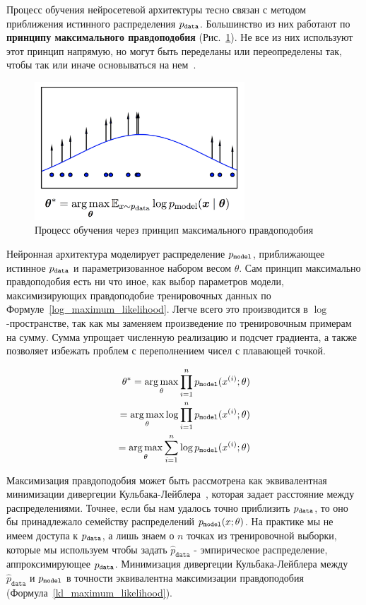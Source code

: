 \documentclass{spbau-diploma}
\begin{document}
Процесс обучения нейросетевой архитектуры тесно связан с методом приближения 
истинного распределения $p_{\texttt{data}}$. Большинство из них работают по 
\textbf{принципу максимального правдоподобия} (Рис.~\ref{mll_density}). Не 
все из них используют этот принцип напрямую, но могут быть переделаны или
переопределены так, чтобы так или иначе основываться на нем~\cite{1701.00160}.

\begin{figure}[H]
\centering
\includegraphics[width=0.7\textwidth]{images/mll_density.png}
\caption{Процесс обучения через принцип максимального правдоподобия~\cite{1701.00160}}
\label{mll_density}
\end{figure}

Нейронная архитектура моделирует распределение $p_{\texttt{model}}$, приближающее истинное
$p_{\texttt{data}}$ и параметризованное набором весом $\theta$. Сам принцип максимально 
правдоподобия есть ни что иное, как выбор параметров модели, максимизирующих
правдоподобие тренировочных данных по Формуле~\ref{log_maximum_likelihood}. 
Легче всего это производится в $\log$-пространстве, так как мы заменяем 
произведение по тренировочным примерам на сумму. Сумма
упрощает численную реализацию и подсчет градиента, а также 
позволяет избежать проблем с переполнением чисел с плавающей точкой. 

\begin{equation}
\label{log_maximum_likelihood}
\begin{split}
\theta^* = \operatorname*{arg\,max}_{\theta} \prod^{n}_{i=1}{p_{\texttt{model}}(x^{(i)}; \theta)} \\
= \operatorname*{arg\,max}_{\theta} \log \prod^{n}_{i=1}{p_{\texttt{model}}(x^{(i)}; \theta)} \\
= \operatorname*{arg\,max}_{\theta} \sum\limits^{n}_{i=1}{\log p_{\texttt{model}}(x^{(i)}; \theta)}
\end{split}
\end{equation}

Максимизация правдоподобия может быть рассмотрена как эквивалентная минимизации
дивергеции Кульбака-Лейблера~\cite{wiki:kldiv}, которая задает
расстояние между распределениями. Точнее, если бы нам удалось точно приблизить 
$p_{\texttt{data}}$, то оно бы принадлежало семейству распределений $p_{\texttt{model}}(x; \theta)$. 
На практике мы не имеем доступа к $p_{\texttt{data}}$, а лишь знаем о $n$ точках из 
тренировочной выборки, которые мы используем чтобы задать $\hat 
p_{\texttt{data}}$ - эмпирическое распределение, аппроксимирующее $p_{\texttt{data}}$. 
Минимизация дивергеции Кульбака-Лейблера между $\hat p_{\texttt{data}}$ и 
$p_{\texttt{model}}$ в точности эквивалентна максимизации правдоподобия
(Формула~\ref{kl_maximum_likelihood}).
\end{document}
